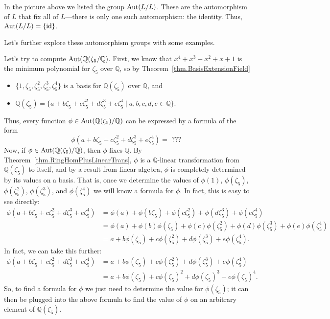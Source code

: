 In the picture above we listed the group $\operatorname{Aut}(L/L)$. These are the automorphism of $L$ that fix all of $L$---there is only one such automorphism: the identity. Thus, $\operatorname{Aut}(L/L) = \{\text{id}\}$. 

Let's further explore these automorphism groups with some examples.

\begin{example}\label{exam.AutQAdjoinZeta5OverQ}
Let's try to compute $\operatorname{Aut}(\mathbb{Q}(\zeta_5/\mathbb{Q})$. First, we know that $x^4+x^3+x^2+x+1$ is the minimum polynomial for $\zeta_5$ over $\mathbb{Q}$, so by Theorem~\ref{thm.BasisExtensionField}  
\begin{itemize}
\item $\{1,\zeta_5,\zeta_5^2,\zeta_5^3,\zeta_5^4\}$ is a basis for $\mathbb{Q}(\zeta_5)$ over $\mathbb{Q}$, and 
\item  $\mathbb{Q}(\zeta_5) = \{a+b\zeta_5+c\zeta_5^2+d\zeta_5^3+e\zeta_5^4\mid a,b,c,d,e\in \mathbb{Q}\}.$
\end{itemize}
Thus, every function $\phi\in \operatorname{Aut}(\mathbb{Q}(\zeta_5)/\mathbb{Q})$ can be expressed by a formula of the form \[\phi(a+b\zeta_5+c\zeta_5^2+d\zeta_5^3+e\zeta_5^4) = \text{ ??? }\]
Now, if $\phi\in \operatorname{Aut}(\mathbb{Q}(\zeta_5)/\mathbb{Q})$, then $\phi$ fixes $\mathbb{Q}$. By Theorem~\ref{thm.RingHomPlusLinearTrans}, $\phi$ is a $\mathbb{Q}$-linear transformation from $\mathbb{Q}(\zeta_5)$ to itself, and by a result from linear algebra, $\phi$ is completely determined by its values on a basis. That is, once we determine the values of $\phi(1)$, $\phi(\zeta_5)$, $\phi(\zeta_5^2)$, $\phi(\zeta_5^3)$, and $\phi(\zeta_5^4)$ we will know a formula for $\phi$. In fact, this is easy to see directly: 
\begin{align*}
\phi(a+b\zeta_5+c\zeta_5^2+d\zeta_5^3+e\zeta_5^4) 
&= \phi(a)+\phi(b\zeta_5)+\phi(c\zeta_5^2)+\phi(d\zeta_5^3)+\phi(e\zeta_5^4)\\
&= \phi(a)+\phi(b)\phi(\zeta_5)+\phi(c)\phi(\zeta_5^2)+\phi(d)\phi(\zeta_5^3)+\phi(e)\phi(\zeta_5^4)\\
&= a+b\phi(\zeta_5)+c\phi(\zeta_5^2)+d\phi(\zeta_5^3)+e\phi(\zeta_5^4).
\end{align*}
In fact, we can take this further:
\begin{align*}
\phi(a+b\zeta_5+c\zeta_5^2+d\zeta_5^3+e\zeta_5^4)
&= a+b\phi(\zeta_5)+c\phi(\zeta_5^2)+d\phi(\zeta_5^3)+e\phi(\zeta_5^4)\\
&= a+b\phi(\zeta_5)+c\phi(\zeta_5)^2+d\phi(\zeta_5)^3+e\phi(\zeta_5)^4.
\end{align*}
So, to find a formula for $\phi$ we just need to determine the value for $\phi(\zeta_5)$; it can then be plugged into the above formula to find the value of $\phi$ on an arbitrary element of  $\mathbb{Q}(\zeta_5)$.


\end{example}
